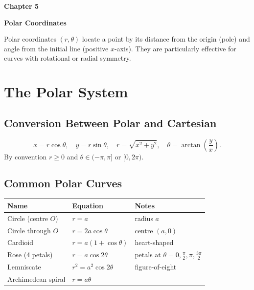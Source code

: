 \documentclass[12pt,a4paper]{article}
\theoremstyle{defstyle}
\newcommand{\chapterbanner}[2]{%
  \clearpage
  \begin{tcolorbox}[colback=chaptercol!10, colframe=chaptercol,
      left=10pt, right=10pt, top=8pt, bottom=8pt]
    {\large\bfseries\color{chaptercol} Chapter #1}\par\vspace{2pt}
    {\LARGE\bfseries #2}
  \end{tcolorbox}
  \vspace{6pt}
}
\begin{document}
\chapterbanner{5}{Polar Coordinates}

Polar coordinates \((r,\theta)\) locate a point by its distance from the origin (pole) and angle from the initial line (positive \(x\)-axis). They are particularly effective for curves with rotational or radial symmetry.

\section{The Polar System}

\subsection{Conversion Between Polar and Cartesian}

\begin{result}{}{}
\[
  x = r\cos\theta,\quad y = r\sin\theta,\quad r = \sqrt{x^2+y^2},\quad \theta=\arctan\!\left(\frac{y}{x}\right).
\]
By convention \(r\geq 0\) and \(\theta\in(-\pi,\pi]\) or \([0,2\pi)\).
\end{result}

\subsection{Common Polar Curves}

\begin{result}{}{}
\renewcommand{\arraystretch}{1.5}
\begin{center}
\begin{tabular}{lll}
\toprule
Name & Equation & Notes \\
\midrule
Circle (centre $O$) & $r=a$ & radius $a$ \\
Circle through $O$ & $r=2a\cos\theta$ & centre $(a,0)$ \\
Cardioid & $r=a(1+\cos\theta)$ & heart-shaped \\
Rose (4 petals) & $r=a\cos2\theta$ & petals at $\theta=0,\tfrac{\pi}{2},\pi,\tfrac{3\pi}{2}$ \\
Lemniscate & $r^2=a^2\cos2\theta$ & figure-of-eight \\
Archimedean spiral & $r=a\theta$ & \\
\bottomrule
\end{tabular}
\end{center}
\end{result}
\end{document}
